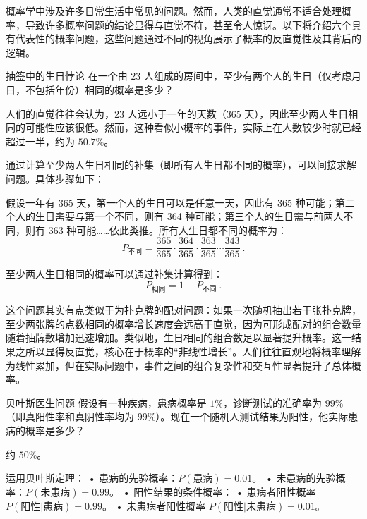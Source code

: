 
概率学中涉及许多日常生活中常见的问题。然而，人类的直觉通常不适合处理概率，导致许多概率问题的结论显得与直觉不符，甚至令人惊讶。以下将介绍六个具有代表性的概率问题，这些问题通过不同的视角展示了概率的反直觉性及其背后的逻辑。

\begin{example}{抽签中的生日悖论}
在一个由 23 人组成的房间中，至少有两个人的生日（仅考虑月日，不包括年份）相同的概率是多少？
\end{example}

人们的直觉往往会认为，23 人远小于一年的天数（365 天），因此至少两人生日相同的可能性应该很低。然而，这种看似小概率的事件，实际上在人数较少时就已经超过一半，约为 $50.7\%$。

通过计算至少两人生日相同的补集（即所有人生日都不同的概率），可以间接求解问题。具体步骤如下：

假设一年有 365 天，第一个人的生日可以是任意一天，因此有 365 种可能；第二个人的生日需要与第一个不同，则有 364 种可能；第三个人的生日需与前两人不同，则有 363 种可能……依此类推。所有人生日都不同的概率为：
\begin{equation}
P_{\text{不同}} = \frac{365}{365} \cdot \frac{364}{365} \cdot \frac{363}{365} \cdots \frac{343}{365}~.
\end{equation}

至少两人生日相同的概率可以通过补集计算得到：
\begin{equation}
P_{\text{相同}} = 1 - P_{\text{不同}}~.
\end{equation}

这个问题其实有点类似于为扑克牌的配对问题：如果一次随机抽出若干张扑克牌，至少两张牌的点数相同的概率增长速度会远高于直觉，因为可形成配对的组合数量随着抽牌数增加迅速增加。类似地，生日相同的组合数足以显著提升概率。这一结果之所以显得反直觉，核心在于概率的“非线性增长”。人们往往直观地将概率理解为线性累加，但在实际问题中，事件之间的组合复杂性和交互性显著提升了总体概率。

\begin{example}{贝叶斯医生问题}
假设有一种疾病，患病概率是 $1\%$，诊断测试的准确率为 $99\%$（即真阳性率和真阴性率均为 $99\%$）。现在一个随机人测试结果为阳性，他实际患病的概率是多少？
\end{example}

约 $50\%$。


    
运用贝叶斯定理：
	•	患病的先验概率：$P(\text{患病}) = 0.01$。
	•	未患病的先验概率：$P(\text{未患病}) = 0.99$。
	•	阳性结果的条件概率：
	•	患病者阳性概率 $P(\text{阳性}|\text{患病}) = 0.99$。
	•	未患病者阳性概率 $P(\text{阳性}|\text{未患病}) = 0.01$。

